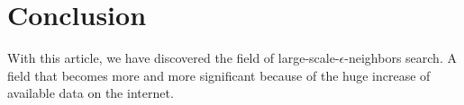 \documentclass{article}
\begin{document}
\section{Conclusion}

With this article, we have discovered the field of large-scale-$\epsilon$-neighbors search. A field that becomes more and more significant because of the huge increase of available data on the internet.  

\end{document}
